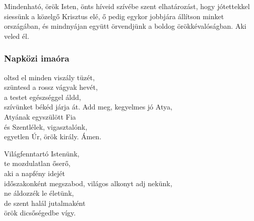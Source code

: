 \documentclass[twoside]{article}
\begin{document}
Mindenható, örök Isten, önts híveid szívébe szent elhatározást, hogy jótettekkel siessünk a közelgő Krisztus elé, ő pedig egykor jobbjára állítson minket országában, és mindnyájan együtt örvendjünk a boldog örökkévalóságban. Aki veled él.

\subsubsection*{Napközi imaóra}

\begin{hymnstanzas}
    oltsd el minden viszály tüzét,\\
    szüntesd a rossz vágyak hevét,\\
    a testet egészséggel áldd,\\
    szívünket békéd járja át.
\stanzabreak
    Add meg, kegyelmes jó Atya,\\
    Atyának egyszülött Fia\\
    és Szentlélek, vigasztalónk,\\
    egyetlen Úr, örök király. Ámen.
\end{hymnstanzas}

\begin{hymnstanzas}
    Világfenntartó Istenünk,\\
    te mozdulatlan őserő,\\
    aki a napfény idejét\\
    időszakonként megszabod,
\stanzabreak
    világos alkonyt adj nekünk,\\
    ne áldozzék le életünk,\\
    de szent halál jutalmaként\\
    örök dicsőségedbe vígy.
\end{hymnstanzas}
\end{document}
